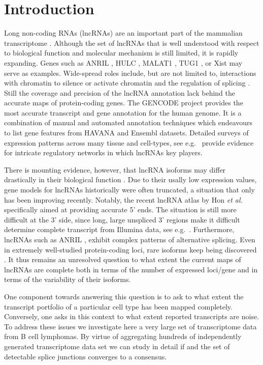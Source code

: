 \documentclass[ncrna,article,submit,moreauthors,pdftex,10pt,a4paper]{mdpi}
\begin{document}
\section{Introduction}

Long non-coding RNAs (lncRNAs) are an important part of the mammalian
transcriptome \cite{Clark:11a,ENCODE:12}. Although the set of lncRNAs that
is well understood with respect to biological function and molecular
mechanism is still limited, it is rapidly expanding. Genes such as ANRIL
\cite{Li:16A,Aguilo:16}, HULC \cite{Yu:17}, MALAT1 \cite{Liu:17}, TUG1
\cite{Li:16}, or Xist \cite{daRocha:17} may serve as examples. Wide-spread
roles include, but are not limited to, interactions with chromatin to
silence or activate chromatin \cite{guttmannat2012,Deng:16} and the
regulation of splicing \cite{Luco:16}. Still the coverage and precision of
the lncRNA annotation lack behind the accurate maps of protein-coding
genes.  The GENCODE project \cite{harrow2012} provides the most accurate
transcript and gene annotation for the human genome. It is a combination of
manual and automated annotation techniques which endeavours to list gene
features from HAVANA and Ensembl datasets. Detailed surveys of expression
patterns across many tissue and cell-types, see e.g.\
\cite{cabili2011,MasPonte:17,Hon:17} provide evidence for intricate
regulatory networks in which lncRNAs key players.

There is mounting evidence, however, that lncRNA isoforms may differ
drastically in their biological function \cite{Holdt:13a,Bozgeyik:16}. Due
to their usally low expression values, gene models for lncRNAs historically
were often truncated, a situation that only has been improving recently.
Notably, the recent lncRNA atlas by Hon \emph{et al.} \cite{Hon:17}
specifically aimed at providing accurate 5' ends. The situation is still
more difficult at the 3' side, since long, large unspliced 3' regions make
it difficult determine complete transcript from Illumina data, see e.g.\
\cite{Mercer:10,Engelhardt:15a}. Furthermore, lncRNAs such as ANRIL
\cite{Holdt:13a}, exhibit complex patterns of alternative splicing. Even in
extremely well-studied protein-coding loci, rare isoforms keep being
discovered \cite{Hoffmann:14a}. It thus remains an unresolved question to
what extent the current maps of lncRNAs are complete both in terms of the
number of expressed loci/gene and in terms of the variability of their
isoforms. 

One component towards answering this question is to ask to what extent the
transcript portfolio of a particular cell type has been mapped completely.
Conversely, one asks in this context to what extent reported transcripts are
noise. To address these issues we investigate here a very large set of
transcriptome data from B cell lymphomas. By virtue of aggregating hundreds
of independently generated transcriptome data set we can study in detail if
and the set of detectable splice junctions converges to a consensus.
\end{document}
